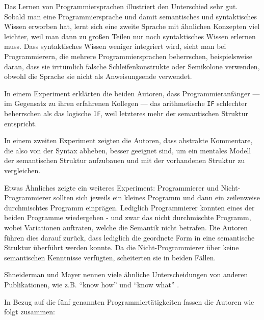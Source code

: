 Das Lernen von Programmiersprachen illustriert den Unterschied sehr gut. Sobald man eine Programmiersprache und damit semantisches und syntaktisches Wissen erworben hat, lernt sich eine zweite Sprache mit ähnlichen Konzepten viel leichter, weil man dann zu großen Teilen nur noch syntaktisches Wissen erlernen muss. Dass syntaktisches Wissen weniger integriert wird, sieht man bei Programmierern, die mehrere Programmiersprachen beherrschen, beispielsweise daran, dass sie irrtümlich falsche Schleifenkonstrukte oder Semikolone verwenden, obwohl die Sprache sie nicht als Anweisungsende verwendet.

In einem Experiment erklärten die beiden Autoren, dass Programmieranfänger --- im Gegensatz zu ihren erfahrenen Kollegen --- das arithmetische \texttt{IF} schlechter beherrschen als das logische \texttt{IF}, weil letzteres mehr der semantischen Struktur entspricht.

In einem zweiten Experiment zeigten die Autoren, dass abstrakte Kommentare, die also von der Syntax abheben, besser geeignet sind, um ein mentales Modell der semantischen Struktur aufzubauen und mit der vorhandenen Struktur zu vergleichen.

Etwas Ähnliches zeigte ein weiteres Experiment: Programmierer und Nicht-Programmierer sollten sich jeweils ein kleines Programm und dann ein zeilenweise durchmischtes Programm einprägen. Lediglich Programmierer konnten eines der beiden Programme wiedergeben - und zwar das nicht durchmischte Programm, wobei Variationen auftraten, welche die Semantik nicht betrafen. Die Autoren führen dies darauf zurück, dass lediglich die geordnete Form in eine semantische Struktur überführt werden konnte. Da die Nicht-Programmierer über keine semantischen Kenntnisse verfügten, scheiterten sie in beiden Fällen.

Shneiderman und Mayer nennen viele ähnliche Unterscheidungen von anderen Publikationen, wie z.B. ``know how'' und ``know what'' \citep{Polya:puYL6ohw}.

In Bezug auf die fünf genannten Programmiertätigkeiten fassen die Autoren wie folgt zusammen:

